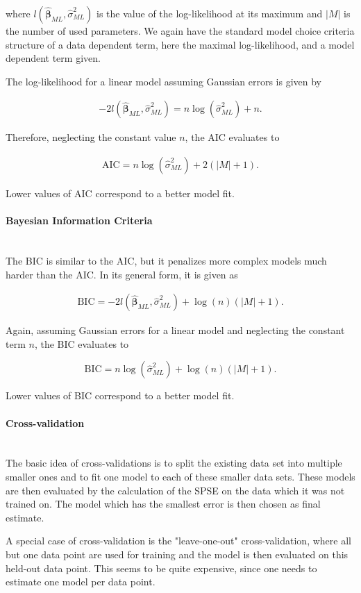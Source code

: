 \documentclass[10pt,a4paper]{article}
\newcommand{\subsubsubsection}[1]{\paragraph{#1}\mbox{}\\}
\begin{document}
where $l(\boldsymbol{\hat{\beta}}_{ML}, \hat \sigma^2_{ML})$ is the value of the log-likelihood at its maximum and $\vert M \vert$ is the number of used parameters. We again have the standard model choice criteria structure of a data dependent term, here the maximal log-likelihood, and a model dependent term given. 

The log-likelihood for a linear model assuming Gaussian errors is given by

\begin{align}
	-2l(\boldsymbol{\hat{\beta}}_{ML}, \hat \sigma_{ML}^2) = n \log(\hat \sigma_{ML}^2) + n.
\end{align}

Therefore, neglecting the constant value $n$, the AIC evaluates to

\begin{align}
	\text{AIC} = n \log(\hat \sigma^2_{ML}) + 2(\vert M \vert + 1).
\end{align}

Lower values of AIC correspond to a better model fit. \cite{fahrmeir2013regression}

\subsubsubsection{Bayesian Information Criteria}

The BIC is similar to the AIC, but it penalizes more complex models much harder than the AIC. In its general form, it is given as 

\begin{align}
	\text{BIC} = -2l(\boldsymbol{\hat{\beta}}_{ML}, \hat \sigma^2_{ML}) + \log(n) (\vert M \vert + 1).
\end{align}

Again, assuming Gaussian errors for a linear model and neglecting the constant term $n$, the BIC evaluates to

$$\text{BIC} = n\log(\hat \sigma_{ML}^2) + \log(n)(\vert M\vert + 1).$$

Lower values of BIC correspond to a better model fit. \cite{fahrmeir2013regression}

\subsubsubsection{Cross-validation}

The basic idea of cross-validations is to split the existing data set into multiple smaller ones and to fit one model to each of these smaller data sets. These models are then evaluated by the calculation of the SPSE on the data which it was not trained on. The model which has the smallest error is then chosen as final estimate. 

A special case of cross-validation is the "leave-one-out" cross-validation, where all but one data point are used for training and the model is then evaluated on this held-out data point. This seems to be quite expensive, since one needs to estimate one model per data point. 
\end{document}
